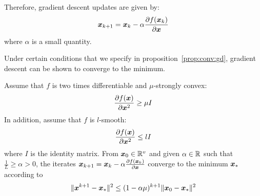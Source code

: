 Therefore, gradient descent updates are given by:
\begin{align}
  \xb_{k+1} = \xb_k -\alpha \partialfrac{\xb}{f(\xb_k)} \label{eq:update:gd}
\end{align}
where $\alpha$ is a small quantity.

Under certain conditions that we specify in proposition~\ref{prop:conv:gd},
gradient descent can be shown to converge to the minimum.

\begin{prop}
  \label{prop:conv:gd}
  Assume that $f$ is two times differentiable and $\mu$-strongly convex:
  \begin{equation}
    \partialfrac{\xb^2}{f(\xb)} \geq \mu I
  \end{equation}
  In addition, assume that $f$ is $l$-smooth:
  \begin{equation}
    \partialfrac{\xb^2}{f(\xb)} \leq lI
  \end{equation}
  where $I$ is the identity matrix.
  From $\xb_0 \in \RR^v$ and given $\alpha \in \RR$ such that $\frac1{L} \geq \alpha > 0$, the iterates
  $\xb_{k+1} = \xb_k -\alpha \partialfrac{\xb}{f(\xb_k)}$ converge to the
  minimum $\xb_*$ according to
  \begin{equation}
    \| \xb^{k+1} - \xb_* \|^2 \leq (1 - \alpha \mu)^{k + 1} \| \xb_0 - \xb_* \|^2
  \end{equation}
\end{prop}
